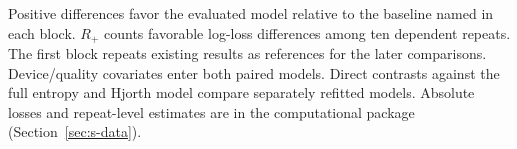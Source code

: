 \begin{minipage}{\textwidth}\footnotesize Positive differences favor the evaluated model relative to the baseline named in each block. $R_+$ counts favorable log-loss differences among ten dependent repeats. The first block repeats existing results as references for the later comparisons. Device/quality covariates enter both paired models. Direct contrasts against the full entropy and Hjorth model compare separately refitted models. Absolute losses and repeat-level estimates are in the computational package (Section~\ref{sec:s-data}).\end{minipage}
\endgroup
